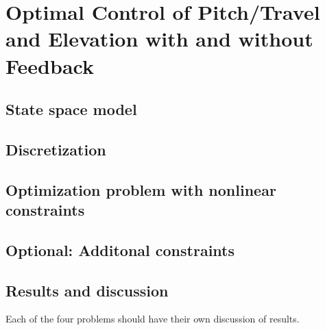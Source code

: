 \section{Optimal Control of Pitch/Travel and Elevation with and without Feedback}\label{sec:prob4}

\subsection{State space model}

\subsection{Discretization}

\subsection{Optimization problem with nonlinear constraints}

\subsection{Optional: Additonal constraints}

\subsection{Results and discussion}
Each of the four problems should have their own discussion of results. 


